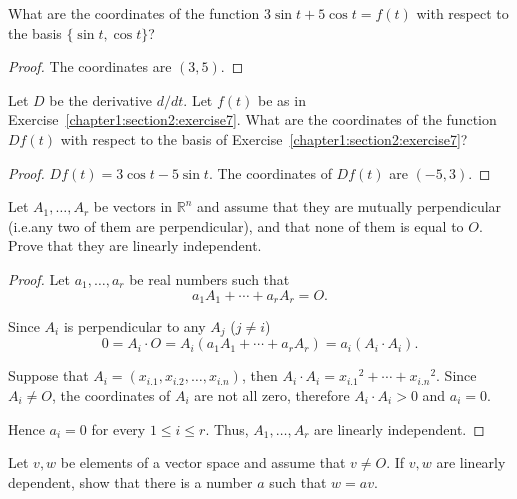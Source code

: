 \begin{exercise}\label{chapter1:section2:exercise7}
    What are the coordinates of the function $3\sin t + 5\cos t = f(t)$ with respect to the basis $\{ \sin t, \cos t \}$?
\end{exercise}

\begin{proof}
    The coordinates are $(3, 5)$.
\end{proof}

\begin{exercise}
    Let $D$ be the derivative $d/dt$. Let $f(t)$ be as in Exercise~\ref{chapter1:section2:exercise7}. What are the coordinates of the function $Df(t)$ with respect to the basis of Exercise~\ref{chapter1:section2:exercise7}?
\end{exercise}

\begin{proof}
    $Df(t) = 3\cos t - 5\sin t$. The coordinates of $Df(t)$ are $(-5, 3)$.
\end{proof}

\begin{exercise}
    Let $A_{1},\ldots, A_{r}$ be vectors in $\mathbb{R}^{n}$ and assume that they are mutually perpendicular (i.e.\@ any two of them are perpendicular), and that none of them is equal to $O$. Prove that they are linearly independent.
\end{exercise}

\begin{proof}
    Let $a_{1},\ldots, a_{r}$ be real numbers such that
    \[
        a_{1}A_{1} + \cdots + a_{r}A_{r} = O.
    \]

    Since $A_{i}$ is perpendicular to any $A_{j}$ ($j\ne i$)
    \[
        0 = A_{i}\cdot O = A_{i}(a_{1}A_{1} + \cdots + a_{r}A_{r}) = a_{i}(A_{i}\cdot A_{i}).
    \]

    Suppose that $A_{i} = (x_{i.1}, x_{i.2}, \ldots, x_{i.n})$, then $A_{i}\cdot A_{i} = {x_{i.1}}^{2} + \cdots + {x_{i.n}}^{2}$. Since $A_{i}\ne O$, the coordinates of $A_{i}$ are not all zero, therefore $A_{i}\cdot A_{i} > 0$ and $a_{i} = 0$.

    Hence $a_{i} = 0$ for every $1\le i \le r$. Thus, $A_{1}, \ldots, A_{r}$ are linearly independent.
\end{proof}

\begin{exercise}
    Let $v, w$ be elements of a vector space and assume that $v\ne O$. If $v, w$ are linearly dependent, show that there is a number $a$ such that $w = av$.
\end{exercise}

